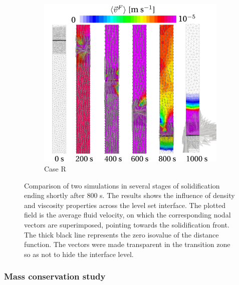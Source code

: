 \begin{figure}[htbp]
\begin{subfigure}{0.6\textwidth}
    \includegraphics[width=\textwidth]{Chapter5/Graphics/1d/ls_velocity_differentprops.pdf}
	\caption{Case R}
    \label{fig:1dalsi7_differentprops}
  \end{subfigure}
\caption{Comparison of two simulations in several stages of solidification ending shortly after 800 s.
The results shows the influence of density and viscosity properties across the level set interface.
The plotted field is the average fluid velocity, on which the corresponding nodal vectors are superimposed, pointing
towards the solidification front. The thick black line represents the zero isovalue of the distance function.
The vectors were made transparent in the transition zone so as not to hide the interface level.}
\label{fig:1dalsi7_caseA1R}
\end{figure}

\subsubsection{Mass conservation study}

